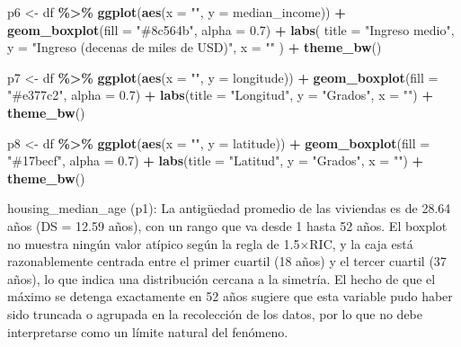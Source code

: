 \documentclass[
]{book}
\newenvironment{Shaded}{\begin{snugshade}}{\end{snugshade}}
\newcommand{\AttributeTok}[1]{\textcolor[rgb]{0.13,0.29,0.53}{#1}}
\newcommand{\FloatTok}[1]{\textcolor[rgb]{0.00,0.00,0.81}{#1}}
\newcommand{\FunctionTok}[1]{\textcolor[rgb]{0.13,0.29,0.53}{\textbf{#1}}}
\newcommand{\NormalTok}[1]{#1}
\newcommand{\OtherTok}[1]{\textcolor[rgb]{0.56,0.35,0.01}{#1}}
\newcommand{\SpecialCharTok}[1]{\textcolor[rgb]{0.81,0.36,0.00}{\textbf{#1}}}
\newcommand{\StringTok}[1]{\textcolor[rgb]{0.31,0.60,0.02}{#1}}
\begin{document}
\begin{Shaded}
\begin{Highlighting}[]
\NormalTok{p6 }\OtherTok{\textless{}{-}}\NormalTok{ df }\SpecialCharTok{\%\textgreater{}\%}
  \FunctionTok{ggplot}\NormalTok{(}\FunctionTok{aes}\NormalTok{(}\AttributeTok{x =} \StringTok{""}\NormalTok{, }\AttributeTok{y =}\NormalTok{ median\_income)) }\SpecialCharTok{+}
  \FunctionTok{geom\_boxplot}\NormalTok{(}\AttributeTok{fill =} \StringTok{"\#8c564b"}\NormalTok{, }\AttributeTok{alpha =} \FloatTok{0.7}\NormalTok{) }\SpecialCharTok{+}
  \FunctionTok{labs}\NormalTok{(}
    \AttributeTok{title =} \StringTok{"Ingreso medio"}\NormalTok{,}
    \AttributeTok{y =} \StringTok{"Ingreso (decenas de miles de USD)"}\NormalTok{,}
    \AttributeTok{x =} \StringTok{""}
\NormalTok{  ) }\SpecialCharTok{+}
  \FunctionTok{theme\_bw}\NormalTok{()}

\NormalTok{p7 }\OtherTok{\textless{}{-}}\NormalTok{ df }\SpecialCharTok{\%\textgreater{}\%}
  \FunctionTok{ggplot}\NormalTok{(}\FunctionTok{aes}\NormalTok{(}\AttributeTok{x =} \StringTok{""}\NormalTok{, }\AttributeTok{y =}\NormalTok{ longitude)) }\SpecialCharTok{+}
  \FunctionTok{geom\_boxplot}\NormalTok{(}\AttributeTok{fill =} \StringTok{"\#e377c2"}\NormalTok{, }\AttributeTok{alpha =} \FloatTok{0.7}\NormalTok{) }\SpecialCharTok{+}
  \FunctionTok{labs}\NormalTok{(}\AttributeTok{title =} \StringTok{"Longitud"}\NormalTok{, }\AttributeTok{y =} \StringTok{"Grados"}\NormalTok{, }\AttributeTok{x =} \StringTok{""}\NormalTok{) }\SpecialCharTok{+}
  \FunctionTok{theme\_bw}\NormalTok{()}

\NormalTok{p8 }\OtherTok{\textless{}{-}}\NormalTok{ df }\SpecialCharTok{\%\textgreater{}\%}
  \FunctionTok{ggplot}\NormalTok{(}\FunctionTok{aes}\NormalTok{(}\AttributeTok{x =} \StringTok{""}\NormalTok{, }\AttributeTok{y =}\NormalTok{ latitude)) }\SpecialCharTok{+}
  \FunctionTok{geom\_boxplot}\NormalTok{(}\AttributeTok{fill =} \StringTok{"\#17becf"}\NormalTok{, }\AttributeTok{alpha =} \FloatTok{0.7}\NormalTok{) }\SpecialCharTok{+}
  \FunctionTok{labs}\NormalTok{(}\AttributeTok{title =} \StringTok{"Latitud"}\NormalTok{, }\AttributeTok{y =} \StringTok{"Grados"}\NormalTok{, }\AttributeTok{x =} \StringTok{""}\NormalTok{) }\SpecialCharTok{+}
  \FunctionTok{theme\_bw}\NormalTok{()}
\end{Highlighting}
\end{Shaded}

housing\_median\_age (p1): La antigüedad promedio de las viviendas es de 28.64 años (DS = 12.59 años), con un rango que va desde 1 hasta 52 años. El boxplot no muestra ningún valor atípico según la regla de 1.5×RIC, y la caja está razonablemente centrada entre el primer cuartil (18 años) y el tercer cuartil (37 años), lo que indica una distribución cercana a la simetría. El hecho de que el máximo se detenga exactamente en 52 años sugiere que esta variable pudo haber sido truncada o agrupada en la recolección de los datos, por lo que no debe interpretarse como un límite natural del fenómeno.
\end{document}
